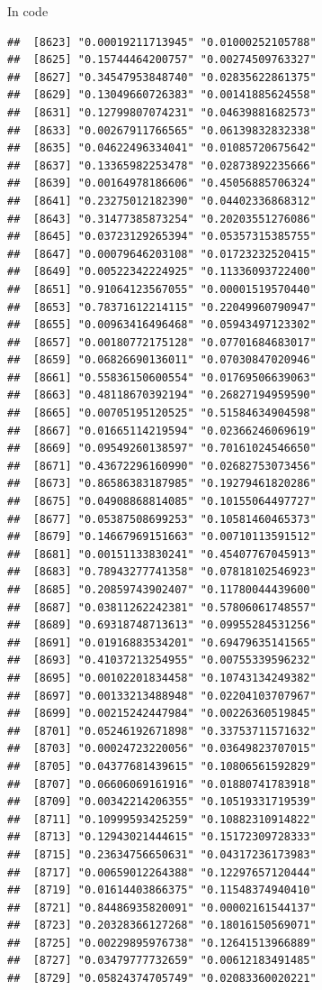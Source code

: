 \documentclass[ignorenonframetext,]{beamer}
\begin{document}
\begin{frame}[fragile]{In code}
\begin{verbatim}
##  [8623] "0.00019211713945" "0.01000252105788"
##  [8625] "0.15744464200757" "0.00274509763327"
##  [8627] "0.34547953848740" "0.02835622861375"
##  [8629] "0.13049660726383" "0.00141885624558"
##  [8631] "0.12799807074231" "0.04639881682573"
##  [8633] "0.00267911766565" "0.06139832832338"
##  [8635] "0.04622496334041" "0.01085720675642"
##  [8637] "0.13365982253478" "0.02873892235666"
##  [8639] "0.00164978186606" "0.45056885706324"
##  [8641] "0.23275012182390" "0.04402336868312"
##  [8643] "0.31477385873254" "0.20203551276086"
##  [8645] "0.03723129265394" "0.05357315385755"
##  [8647] "0.00079646203108" "0.01723232520415"
##  [8649] "0.00522342224925" "0.11336093722400"
##  [8651] "0.91064123567055" "0.00001519570440"
##  [8653] "0.78371612214115" "0.22049960790947"
##  [8655] "0.00963416496468" "0.05943497123302"
##  [8657] "0.00180772175128" "0.07701684683017"
##  [8659] "0.06826690136011" "0.07030847020946"
##  [8661] "0.55836150600554" "0.01769506639063"
##  [8663] "0.48118670392194" "0.26827194959590"
##  [8665] "0.00705195120525" "0.51584634904598"
##  [8667] "0.01665114219594" "0.02366246069619"
##  [8669] "0.09549260138597" "0.70161024546650"
##  [8671] "0.43672296160990" "0.02682753073456"
##  [8673] "0.86586383187985" "0.19279461820286"
##  [8675] "0.04908868814085" "0.10155064497727"
##  [8677] "0.05387508699253" "0.10581460465373"
##  [8679] "0.14667969151663" "0.00710113591512"
##  [8681] "0.00151133830241" "0.45407767045913"
##  [8683] "0.78943277741358" "0.07818102546923"
##  [8685] "0.20859743902407" "0.11780044439600"
##  [8687] "0.03811262242381" "0.57806061748557"
##  [8689] "0.69318748713613" "0.09955284531256"
##  [8691] "0.01916883534201" "0.69479635141565"
##  [8693] "0.41037213254955" "0.00755339596232"
##  [8695] "0.00102201834458" "0.10743134249382"
##  [8697] "0.00133213488948" "0.02204103707967"
##  [8699] "0.00215242447984" "0.00226360519845"
##  [8701] "0.05246192671898" "0.33753711571632"
##  [8703] "0.00024723220056" "0.03649823707015"
##  [8705] "0.04377681439615" "0.10806561592829"
##  [8707] "0.06606069161916" "0.01880741783918"
##  [8709] "0.00342214206355" "0.10519331719539"
##  [8711] "0.10999593425259" "0.10882310914822"
##  [8713] "0.12943021444615" "0.15172309728333"
##  [8715] "0.23634756650631" "0.04317236173983"
##  [8717] "0.00659012264388" "0.12297657120444"
##  [8719] "0.01614403866375" "0.11548374940410"
##  [8721] "0.84486935820091" "0.00002161544137"
##  [8723] "0.20328366127268" "0.18016150569071"
##  [8725] "0.00229895976738" "0.12641513966889"
##  [8727] "0.03479777732659" "0.00612183491485"
##  [8729] "0.05824374705749" "0.02083360020221"

\end{verbatim}
\end{frame}
\end{document}
